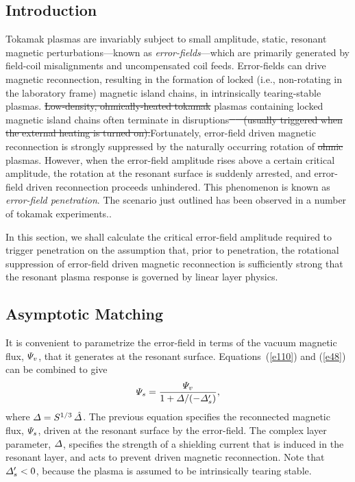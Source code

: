 \documentclass[12pt,prb,aps]{revtex4-1}
\providecommand{\DIFadd}[1]{{\protect\color{blue}\uwave{#1}}} %
\providecommand{\DIFdel}[1]{{\protect\color{red}\sout{#1}}}                      %
\providecommand{\DIFaddbegin}{} %
\providecommand{\DIFaddend}{} %
\providecommand{\DIFdelbegin}{} %
\providecommand{\DIFdelend}{} %
\begin{document}
\subsection{Introduction}
Tokamak plasmas are invariably subject to small amplitude, static, resonant magnetic perturbations---known as
{\em error-fields}---which are primarily generated by field-coil misalignments and uncompensated coil feeds. 
Error-fields can drive magnetic reconnection, resulting in the formation of  locked (i.e., non-rotating in the laboratory
frame) magnetic island chains, in intrinsically tearing-stable plasmas. \DIFdelbegin \DIFdel{Low-density, ohmically-heated tokamak }\DIFdelend \DIFaddbegin \DIFadd{Tokamak }\DIFaddend plasmas
containing locked magnetic island chains often terminate in disruptions\DIFdelbegin \DIFdel{\,\mbox{%
\cite{wes1} }\hspace{0pt}%
(usually triggered when the
external heating is turned on).}\DIFdelend \DIFaddbegin \DIFadd{.\mbox{%
\cite{wes1} }\hspace{0pt}%
}\DIFaddend Fortunately, error-field driven magnetic reconnection is strongly
suppressed by the naturally occurring rotation of \DIFdelbegin \DIFdel{ohmic }\DIFdelend \DIFaddbegin \DIFadd{such }\DIFaddend plasmas. However, when the error-field amplitude rises
above a certain critical amplitude, the rotation at the resonant surface is suddenly arrested, and error-field driven reconnection proceeds
unhindered. This phenomenon is known as {\em error-field penetration}.\cite{rf1993,rf1998} The scenario
just outlined has been observed in a number of tokamak experiments.\cite{scoville, hender,
fishpool,wolf, wolfe,howell,menard,wang1,wang2}. 

In this section, we shall calculate the critical error-field amplitude required to trigger penetration on the assumption that,
prior to penetration, the rotational suppression of error-field driven magnetic reconnection is sufficiently strong that
the resonant plasma response is governed by linear layer physics.\cite{rf1993,rf1998,cole}

\subsection{Asymptotic Matching}
It is convenient to parametrize the error-field in terms of the vacuum magnetic flux, ${\mit\Psi}_v$, that it generates at the resonant surface. 
Equations~(\ref{e110}) and (\ref{e48}) can be combined to give
\begin{equation}\label{e383}
{\mit\Psi}_s= \frac{{\mit\Psi}_v}{1+{\mit\Delta}/(-{\mit\Delta}_s')},
\end{equation}
where ${\mit\Delta} = S^{1/3}\,\hat{\mit\Delta}$. 
The previous equation specifies the reconnected magnetic flux, ${\mit\Psi}_s$, driven at the resonant surface by the error-field. The complex layer parameter, ${\mit\Delta}$, specifies the strength of a shielding current
that is induced in the resonant layer, and acts to prevent driven magnetic reconnection. Note that ${\mit\Delta}_s'<0$, because the
plasma is assumed to be intrinsically tearing stable. 
\end{document}
